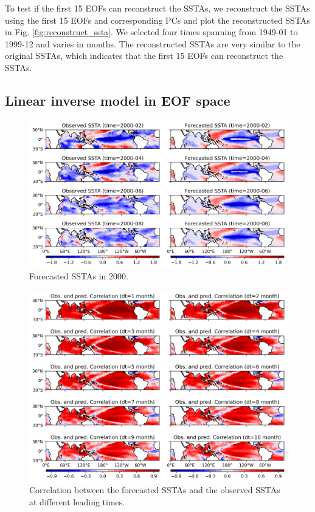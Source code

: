 \documentclass[12pt,a4paper]{article}
\begin{document}
To test if the first 15 EOFs can reconstruct the SSTAs, we reconstruct the SSTAs using the first 15 EOFs and corresponding PCs and plot the reconstructed SSTAs in Fig. \ref{fig:reconstruct_ssta}. We selected four times spanning from 1949-01 to 1999-12 and varies in months. The reconstructed SSTAs are very similar to the original SSTAs, which indicates that the first 15 EOFs can reconstruct the SSTAs.

\subsection{Linear inverse model in EOF space}\label{lim-eof-space}

\begin{figure}
\centering
\includegraphics[width=\textwidth]{figures/forecasted_ssta_2000.png}
\caption{Forecasted SSTAs in 2000.}
\label{fig:forecasted_ssta_2000}
\end{figure}

\begin{figure}
\centering
\includegraphics[width=\textwidth]{figures/corre_at_diff_leading_time.png}
\caption{Correlation between the forecasted SSTAs and the observed SSTAs at different leading times.}
\label{fig:corre_at_diff_leading_time}
\end{figure}
\end{document}
